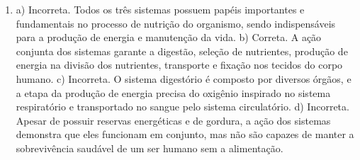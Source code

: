 \begin{enumerate}
\item
a) Incorreta. Todos os três sistemas possuem papéis importantes e
fundamentais no processo de nutrição do organismo, sendo indispensáveis
para a produção de energia e manutenção da vida.
b) Correta. A ação conjunta dos sistemas garante a digestão, seleção de
nutrientes, produção de energia na divisão dos nutrientes, transporte e
fixação nos tecidos do corpo humano.
c) Incorreta. O sistema digestório é composto por diversos órgãos, e a
etapa da produção de energia precisa do oxigênio inspirado no sistema
respiratório e transportado no sangue pelo sistema circulatório.
d) Incorreta. Apesar de possuir reservas energéticas e de gordura, a
ação dos sistemas demonstra que eles funcionam em conjunto, mas não são
capazes de manter a sobrevivência saudável de um ser humano sem a
alimentação.
\end{enumerate}

